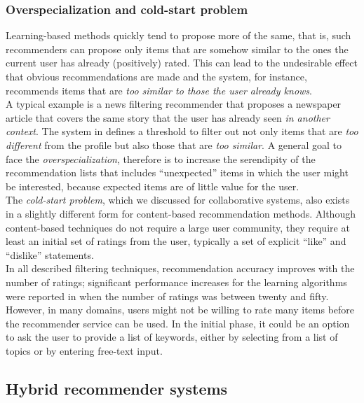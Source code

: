 \subsubsection{Overspecialization and cold-start problem}

Learning-based methods quickly tend to propose
more of the same, that is, such recommenders can propose only items
that are somehow similar to the ones the current user has already
(positively) rated. This can lead to the undesirable effect that
obvious recommendations are made and the system, for instance,
recommends items that are \textit{too similar to those the user already knows}.
\\A typical example is a news filtering recommender that proposes a
newspaper article that covers the same story that the user has already
seen \textit{in another context}. The system in \cite{billsus1999personal} 
defines a threshold to filter out not only items that
are \textit{too different} from the profile but also those that are \textit{too
similar}. A general goal to face the \textit{overspecialization},
therefore is to increase the serendipity of the recommendation lists
that includes “unexpected” items in which the user might be
interested, because expected items are of little value for the user.\\
The \textit{cold-start problem}, which we discussed for collaborative
systems, also exists in a slightly different form for content-based
recommendation methods. Although content-based techniques do not
require a large user community, they require at least an initial set
of ratings from the user, typically a set of explicit “like” and
“dislike” statements. \\In all described filtering techniques,
recommendation accuracy improves with the number of ratings;
significant performance increases for the learning algorithms were
reported in \cite{pazzani1997learning}  when the number of ratings was
between twenty and fifty. \\However, in many domains, users might not be
willing to rate many items before the recommender service can be
used. In the initial phase, it could be an option to ask the user to
provide a list of keywords, either by selecting from a list of topics
or by entering free-text input.

\subsection{Hybrid recommender systems} 

